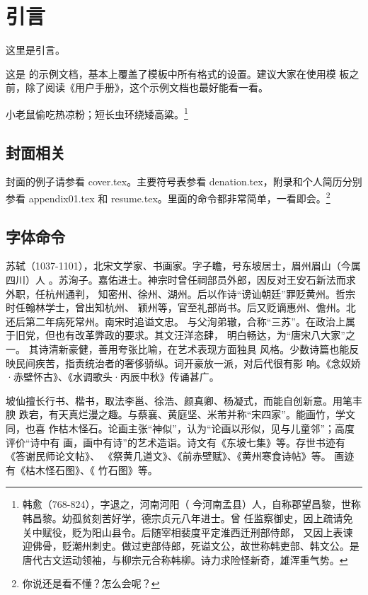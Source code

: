 \chapter{引言}
这里是引言。

这是  的示例文档，基本上覆盖了模板中所有格式的设置。建议大家在使用模
板之前，除了阅读《用户手册》，这个示例文档也最好能看一看。

小老鼠偷吃热凉粉；短长虫环绕矮高粱。\footnote{韩愈（768-824），字退之，河南河阳（
	今河南孟县）人，自称郡望昌黎，世称韩昌黎。幼孤贫刻苦好学，德宗贞元八年进士。曾
	任监察御史，因上疏请免关中赋役，贬为阳山县令。后随宰相裴度平定淮西迁刑部侍郎，
	又因上表谏迎佛骨，贬潮州刺史。做过吏部侍郎，死谥文公，故世称韩吏部、韩文公。是
	唐代古文运动领袖，与柳宗元合称韩柳。诗力求险怪新奇，雄浑重气势。}


\section{封面相关}
封面的例子请参看 cover.tex。主要符号表参看 denation.tex，附录和个人简历分别参看 appendix01.tex
和 resume.tex。里面的命令都非常简单，一看即会。\footnote{你说还是看不懂？怎么会呢？}

\section{字体命令}
\label{sec:first}

苏轼（1037-1101），北宋文学家、书画家。字子瞻，号东坡居士，眉州眉山（今属四川）人
。苏洵子。嘉佑进士。神宗时曾任祠部员外郎，因反对王安石新法而求外职，任杭州通判，
知密州、徐州、湖州。后以作诗“谤讪朝廷”罪贬黄州。哲宗时任翰林学士，曾出知杭州、
颖州等，官至礼部尚书。后又贬谪惠州、儋州。北还后第二年病死常州。南宋时追谥文忠。
与父洵弟辙，合称“三苏”。在政治上属于旧党，但也有改革弊政的要求。其文汪洋恣肆，
明白畅达，为“唐宋八大家”之一。  其诗清新豪健，善用夸张比喻，在艺术表现方面独具
风格。少数诗篇也能反映民间疾苦，指责统治者的奢侈骄纵。词开豪放一派，对后代很有影
响。《念奴娇·赤壁怀古》、《水调歌头·丙辰中秋》传诵甚广。

{坡仙擅长行书、楷书，取法李邕、徐浩、颜真卿、杨凝式，而能自创新意。用笔丰腴
	跌宕，有天真烂漫之趣。与蔡襄、黄庭坚、米芾并称“宋四家”。能画竹，学文同，也喜
	作枯木怪石。论画主张“神似”，认为“论画以形似，见与儿童邻”；高度评价“诗中有
	画，画中有诗”的艺术造诣。诗文有《东坡七集》等。存世书迹有《答谢民师论文帖》、
	《祭黄几道文》、《前赤壁赋》、《黄州寒食诗帖》等。  画迹有《枯木怪石图》、《
	竹石图》等。}

